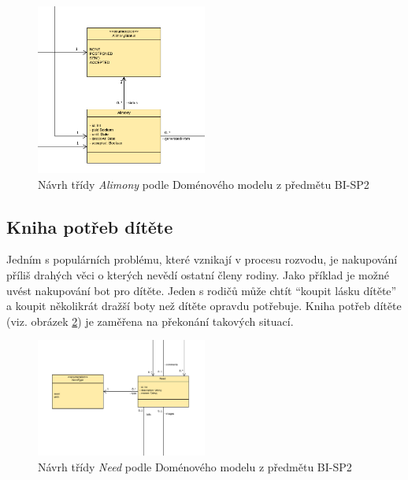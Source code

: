         \begin{figure}\centering
	        \includegraphics[width=0.5\textwidth]{pdfs/Alimony1}
	        \caption[Návrh Alimony]{Návrh třídy \textit{Alimony} podle Doménového modelu z předmětu BI-SP2}\label{image:Alimony1}
        \end{figure}
    \subsection{Kniha potřeb dítěte}
    
        Jedním s populárních problému, které vznikají v procesu rozvodu, je nakupování příliš drahých věci o kterých nevědí ostatní členy rodiny. Jako příklad je možné uvést nakupování bot pro dítěte. Jeden s rodičů může chtít \enquote{koupit lásku dítěte} a koupit několikrát dražší boty než dítěte opravdu potřebuje. Kniha potřeb dítěte (viz. obrázek \ref{image:Need1}) je zaměřena na překonání takových situací.
        \begin{figure}\centering
	        \includegraphics[width=0.5\textwidth]{pdfs/Need1}
	        \caption[Návrh Need]{Návrh třídy \textit{Need} podle Doménového modelu z předmětu BI-SP2}\label{image:Need1}
        \end{figure}
        
